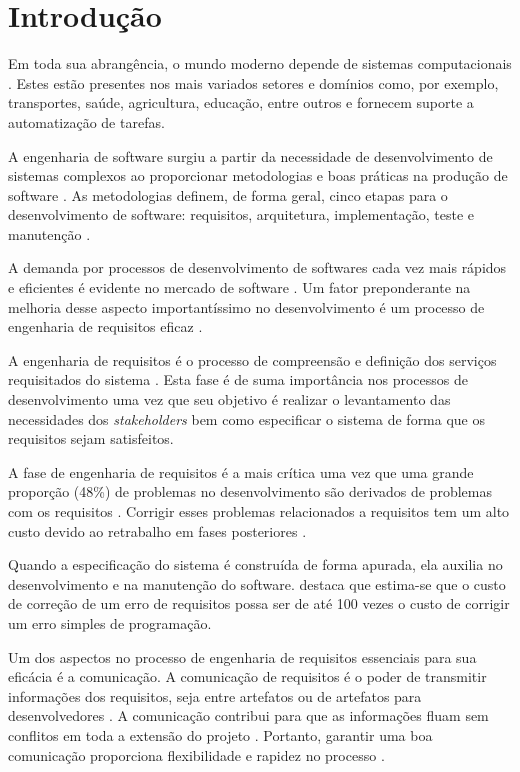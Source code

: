 \chapter{Introdução}
\label{cap:introducao}



    Em toda sua abrangência, o mundo moderno depende de sistemas computacionais \cite{sommerville}. Estes estão presentes nos mais variados setores e domínios como, por exemplo, transportes, saúde, agricultura, educação, entre outros e fornecem suporte a automatização de tarefas.
    
    A engenharia de software surgiu a partir da necessidade de desenvolvimento de sistemas complexos ao proporcionar metodologias e boas práticas na produção de software \cite{sommerville}. As metodologias definem, de forma geral, cinco etapas para o desenvolvimento de software: requisitos, arquitetura, implementação, teste e manutenção \cite{sommerville, pressman2005software}.
    
A demanda por processos de desenvolvimento de softwares cada vez mais rápidos e eficientes é evidente no mercado de software \cite{pressman2005software}. Um fator preponderante na melhoria desse aspecto importantíssimo no desenvolvimento é um processo de engenharia de requisitos eficaz \cite{kotonya}.

A engenharia de requisitos é o processo de compreensão e definição dos serviços requisitados do sistema \cite{sommerville}. Esta fase é de suma importância nos processos de desenvolvimento uma vez que seu objetivo é realizar o levantamento das necessidades dos \emph{stakeholders} bem como especificar o sistema de forma que os requisitos sejam satisfeitos.

A fase de engenharia de requisitos é a mais crítica uma vez que uma grande proporção (48\%) de problemas no desenvolvimento \cite{hall2002requirements} são derivados de problemas com os requisitos \cite{unirepm, gorschekREModel}. Corrigir esses problemas relacionados a requisitos tem um alto custo devido ao retrabalho em fases posteriores \cite{boehm1988costs, leffingwell1997calculating}.

Quando a especificação do sistema é construída de forma apurada, ela auxilia no desenvolvimento e na manutenção do software. \cite{kotonya} destaca que estima-se que o custo de correção de um erro de requisitos possa ser de até 100 vezes o custo de corrigir um erro simples de programação.

Um dos aspectos no processo de engenharia de requisitos essenciais para sua eficácia é a comunicação. A comunicação de requisitos é o poder de transmitir informações dos requisitos, seja entre artefatos ou de artefatos para desenvolvedores \cite{liskin2015artifacts}. A comunicação contribui para que as informações fluam sem conflitos em toda a extensão do projeto \cite{Peixoto}. Portanto, garantir uma boa comunicação proporciona flexibilidade e rapidez no processo \cite{Peixoto}.


